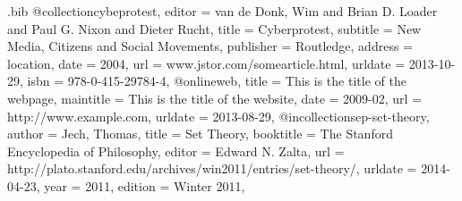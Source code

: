 \RequirePackage{filecontents}
\begin{filecontents*}{\jobname.bib}
@collection{cybeprotest,
  editor    = {van de Donk, Wim and Brian D. Loader and Paul G. Nixon and Dieter Rucht},
  title     = {Cyberprotest},
  subtitle  = {New Media, Citizens and Social Movements},
  publisher = {Routledge},
  address   = {location},
  date      = {2004},
  url       = {www.jstor.com/somearticle.html},
  urldate   = {2013-10-29},
  isbn      = {978-0-415-29784-4},
}
@online{web,
  title     = {This is the title of the webpage},
  maintitle = {This is the title of the website},
  date      = {2009-02},
  url       = {http://www.example.com},
  urldate   = {2013-08-29},
}
@incollection{sep-set-theory,
  author       = {Jech, Thomas},
  title        = {Set Theory},
  booktitle    = {The Stanford Encyclopedia of Philosophy},
  editor       = {Edward N. Zalta},
  url          = {http://plato.stanford.edu/archives/win2011/entries/set-theory/},
  urldate      = {2014-04-23},
  year         = {2011},
  edition      = {Winter 2011},
}
\end{filecontents*}

\documentclass[11pt]{article}%
\usepackage[backend=biber,style=authoryear]{biblatex}
\usepackage{hyperref}






\section{Books}

